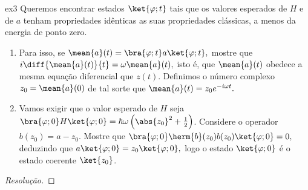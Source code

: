 \begin{exercício}{}{ex3}
   Queremos encontrar estados \(\ket{\varphi; t}\) tais que os valores esperados de \(H\) e de \(a\) tenham propriedades idênticas as suas propriedades clássicas, a menos da energia de ponto zero. 
   \begin{enumerate}[label=(\alph*)]
      \item Para isso, se \(\mean{a}(t) = \bra{\varphi; t}a\ket{\varphi; t},\) mostre que \(i \diff{\mean{a}(t)}{t} = \omega \mean{a}(t),\) isto é, que \(\mean{a}(t)\) obedece a mesma equação diferencial que \(z(t).\) Definimos o número complexo \(z_0 = \mean{a}(0)\) de tal sorte que \(\mean{a}(t) = z_0 e^{-i \omega t}.\)

      \item Vamos exigir que o valor esperado de \(H\) seja \(\bra{\varphi; 0} H \ket{\varphi; 0} = \hbar \omega \left(\abs{z_0}^2 + \frac12\right)\). Considere o operador \(b(z_0) = a - z_0.\) Mostre que \(\bra{\varphi; 0} \herm{b}(z_0) b(z_0) \ket{\varphi; 0} = 0,\) deduzindo que \(a \ket{\varphi; 0} = z_0 \ket{\varphi; 0},\) logo o estado \(\ket{\varphi; 0}\) é o estado coerente \(\ket{z_0}\).
   \end{enumerate}
\end{exercício}
\begin{proof}[Resolução]
    
\end{proof}

